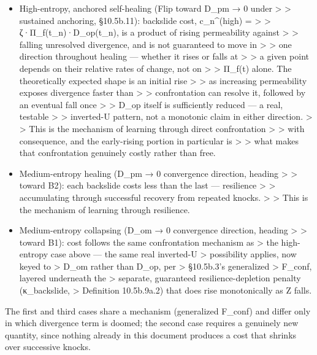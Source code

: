 \documentclass[
]{article}
\begin{document}
\begin{itemize}
\item
  High-entropy, anchored self-healing (Flip toward D\_pm → 0 under
  \textgreater{} \textgreater{} sustained anchoring, §10.5b.11):
  backslide cost, c\_n\^{}(high) = \textgreater{} \textgreater{}
  ζ·Π\_f(t\_n)·D\_op(t\_n), is a product of rising permeability against
  \textgreater{} \textgreater{} falling unresolved divergence, and is
  not guaranteed to move in \textgreater{} \textgreater{} one direction
  throughout healing --- whether it rises or falls at \textgreater{}
  \textgreater{} a given point depends on their relative rates of
  change, not on \textgreater{} \textgreater{} Π\_f(t) alone. The
  theoretically expected shape is an initial rise \textgreater{}
  \textgreater{} as increasing permeability exposes divergence faster
  than \textgreater{} \textgreater{} confrontation can resolve it,
  followed by an eventual fall once \textgreater{} \textgreater{} D\_op
  itself is sufficiently reduced --- a real, testable \textgreater{}
  \textgreater{} inverted-U pattern, not a monotonic claim in either
  direction. \textgreater{} \textgreater{} This is the mechanism of
  learning through direct confrontation \textgreater{} \textgreater{}
  with consequence, and the early-rising portion in particular is
  \textgreater{} \textgreater{} what makes that confrontation genuinely
  costly rather than free.
\item
  Medium-entropy healing (D\_pm → 0 convergence direction, heading
  \textgreater{} \textgreater{} toward B2): each backslide costs less
  than the last --- resilience \textgreater{} \textgreater{}
  accumulating through successful recovery from repeated knocks.
  \textgreater{} \textgreater{} This is the mechanism of learning
  through resilience.
\item
  Medium-entropy collapsing (D\_om → 0 convergence direction, heading
  \textgreater{} \textgreater{} toward B1): cost follows the same
  confrontation mechanism as \textgreater{} the high-entropy case above
  --- the same real inverted-U \textgreater{} possibility applies, now
  keyed to \textgreater{} D\_om rather than D\_op, per \textgreater{}
  §10.5b.3's generalized \textgreater{} F\_conf, layered underneath the
  \textgreater{} separate, guaranteed resilience-depletion penalty
  (κ\_backslide, \textgreater{} Definition 10.5b.9a.2) that does rise
  monotonically as Z falls.
\end{itemize}

The first and third cases share a mechanism (generalized F\_conf) and
differ only in which divergence term is doomed; the second case requires
a genuinely new quantity, since nothing already in this document
produces a cost that shrinks over successive knocks.
\end{document}
